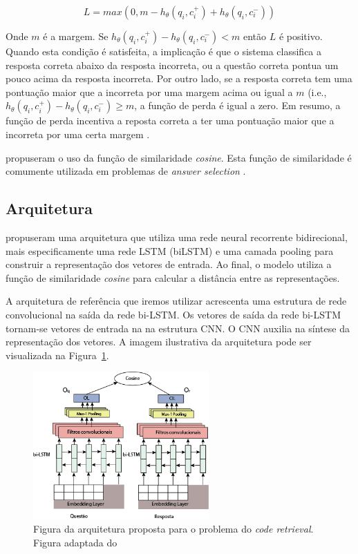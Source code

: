 \documentclass[12pt]{article}
\begin{document}
\begin{equation}
L = max(0, m - h_{\theta}(q_{i}, c_{i}^{+}) + h_{\theta}(q_{i}, c_{i}^{-}))   
\end{equation}


Onde $m$ é a margem. Se $h_{\theta}(q_{i}, c_{i}^{+}) - h_{\theta}(q_{i}, c_{i}^{-}) < m$ então $L$ é positivo. Quando esta condição é satisfeita, a implicação é que o sistema classifica a resposta correta abaixo da resposta incorreta, ou a questão correta pontua um pouco acima da resposta incorreta. Por outro lado, se a resposta correta tem uma pontuação maior que a incorreta por uma margem acima ou igual a $m$ (i.e., $h_{\theta}(q_{i}, c_{i}^{+}) - h_{\theta}(q_{i}, c_{i}^{-}) \geq m$, a função de perda é igual a zero. Em resumo, a função de perda incentiva a reposta correta a ter uma pontuação maior que a incorreta por uma certa margem \cite{lai-etal-2018-review}.

\cite{tan-lstm-qa} propuseram o uso da função de similaridade \textit{cosine}. Esta função de similaridade é comumente utilizada em problemas de \textit{answer selection} \cite{feng-answer-selection-2015}. 

\subsection{Arquitetura}

\cite{tan-lstm-qa} propuseram uma arquitetura que utiliza uma rede neural recorrente bidirecional, mais especificamente uma rede LSTM (biLSTM) \cite{hochreiter-Schmidhuber-lstm-1997} e uma camada pooling para construir a representação dos vetores de entrada. Ao final, o modelo utiliza a função de similaridade \textit{cosine} para calcular a distância
entre as representações. 

A arquitetura de referência que iremos utilizar acrescenta uma estrutura de rede convolucional na saída da rede bi-LSTM. Os vetores de saída da rede bi-LSTM tornam-se vetores de entrada na na estrutura CNN. O CNN auxilia na síntese da representação dos vetores. A imagem ilustrativa da arquitetura pode ser visualizada na Figura~\ref{fig:arquitetura-bi-lstm}.


\begin{figure}[h]
    \centering
    \includegraphics[width=0.60\textwidth]{figures/ArquiteturaBiLSTM.png}
    \caption{Figura da arquitetura proposta para o problema do \textit{code retrieval}. Figura adaptada do \cite{tan-lstm-qa}}
    \label{fig:arquitetura-bi-lstm}
\end{figure}
\end{document}
